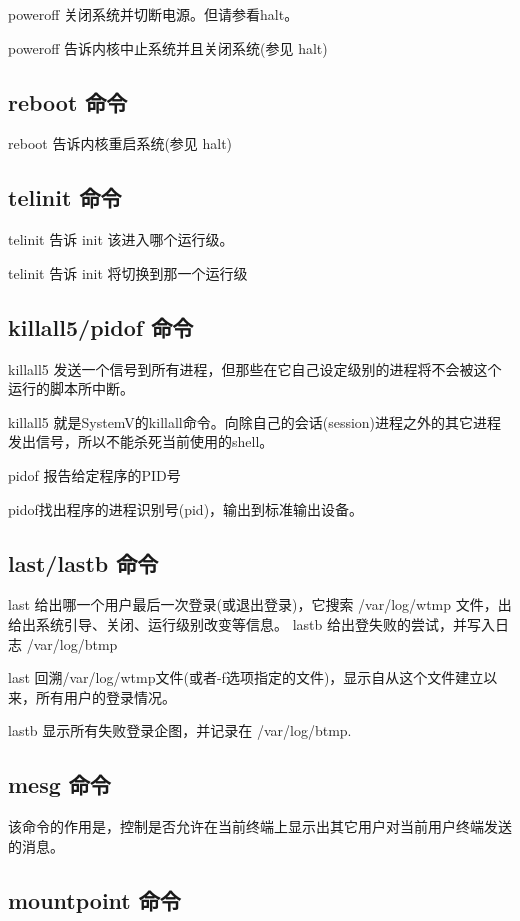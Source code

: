 poweroff 关闭系统并切断电源。但请参看halt。

poweroff 告诉内核中止系统并且关闭系统(参见 halt)

\subsection{reboot 命令}

reboot 告诉内核重启系统(参见 halt)

\subsection{telinit 命令}

telinit 告诉 init 该进入哪个运行级。

telinit 告诉 init 将切换到那一个运行级

\subsection{killall5/pidof 命令}

killall5
发送一个信号到所有进程，但那些在它自己设定级别的进程将不会被这个运行的脚本所中断。

killall5
就是SystemV的killall命令。向除自己的会话(session)进程之外的其它进程发出信号，所以不能杀死当前使用的shell。

pidof 报告给定程序的PID号

pidof找出程序的进程识别号(pid)，输出到标准输出设备。

\subsection{last/lastb 命令}

last 给出哪一个用户最后一次登录(或退出登录)，它搜索 /var/log/wtmp
文件，出给出系统引导、关闭、运行级别改变等信息。 lastb
给出登失败的尝试，并写入日志 /var/log/btmp

last
回溯/var/log/wtmp文件(或者-f选项指定的文件)，显示自从这个文件建立以来，所有用户的登录情况。

lastb 显示所有失败登录企图，并记录在 /var/log/btmp.

\subsection{mesg 命令}

该命令的作用是，控制是否允许在当前终端上显示出其它用户对当前用户终端发送的消息。

\subsection{mountpoint 命令}

